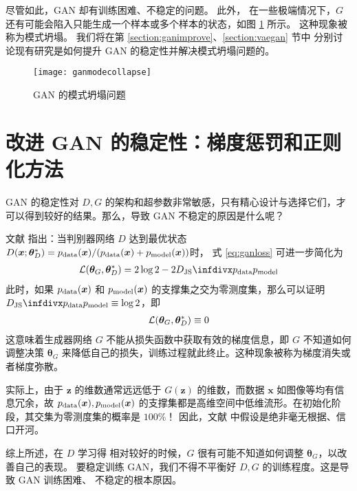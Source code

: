 尽管如此，GAN 却有训练困难、不稳定的问题。
此外，
在一些极端情况下，$G$ 还有可能会陷入只能生成一个样本或多个样本的状态，如图 \ref{fig:ganmodecollapse} 所示。
这种现象被称为模式坍塌。
我们将在第 \ref{section:ganimprove}、\ref{section:vaegan} 节中%
分别讨论现有研究是如何提升 GAN 的稳定性并解决模式坍塌问题的。

\begin{figure}[h]
	\centering%
	{\texttt{[image: ganmodecollapse]}}%
	\caption{GAN 的模式坍塌问题}\label{fig:ganmodecollapse}
\end{figure}

\section{改进 GAN 的稳定性：梯度惩罚和正则化方法 \label{section:ganimprove}}
GAN 的稳定性对 $D, G$ 的架构和超参数非常敏感，只有精心设计与选择它们，才可以得到较好的结果\cite{dcgan}。那么，导致 GAN 不稳定的原因是什么呢？

文献  指出：当判别器网络 $D$
达到最优状态 $D(\bm x; \bm\theta_D^*) = p_{\mathrm {data}}(\bm x)/(p_{\mathrm {data}}(\bm x) + p_{\mathrm {model}}(\bm x))$时，
式 \eqref{eq:ganloss} 可进一步简化为
\begin{align}
	\Loss(\bm\theta_G, \bm\theta_D^*) = 2\log 2 - 2 \DJS{\PDATA}{\PMODEL} \label{eq:ganlossjs}
\end{align}
此时，如果 $p_{\mathrm {data}}(\bm x)$ 和 $p_{\mathrm {model}}(\bm x)$ 的支撑集之交为零测度集，那么可以证明 $\DJS{\PDATA}{\PMODEL} \equiv \log 2$，即
\begin{align}
	\mathcal{L}(\bm\theta_G, \bm\theta_D^*) \equiv 0 \label{eq:nograd}
\end{align}
这意味着生成器网络 $G$ 不能从损失函数中获取有效的梯度信息，即 $G$ 不知道如何调整决策 $\bm\theta_G$ 来降低自己的损失，训练过程就此终止。这种现象被称为梯度消失或者梯度弥散。

实际上，由于 $\bm z$ 的维数通常远远低于 $G(\bm z)$ 的维数，而数据 $\bm x$ 如图像等均有信息冗余，故
$p_{\mathrm {data}}(\bm x), p_{\mathrm {model}}(\bm x)$ 的支撑集都是高维空间中低维流形。在初始化阶段，其交集为零测度集的概率是 $100\%$！
因此，文献  中假设是绝非毫无根据、信口开河。%

综上所述，在 $D$ 学习得
相对较好的时候，$G$ 很有可能不知道如何调整 $\bm\theta_G$，以改善自己的表现。
要稳定训练 GAN，我们不得不平衡好 $D, G$ 的训练程度。这是导致 GAN 训练困难、
不稳定的根本原因。


